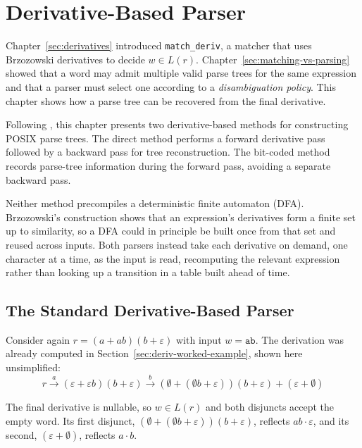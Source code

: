 \chapter{Derivative-Based Parser}
\label{sec:derivative-parser}

Chapter~\ref{sec:derivatives} introduced \texttt{match\_deriv},
a matcher that uses Brzozowski derivatives to decide $w \in L(r)$. 
Chapter~\ref{sec:matching-vs-parsing} showed 
that a word may admit multiple valid parse trees for the same expression
and that a parser must select one according to a \emph{disambiguation policy}.
This chapter shows how a parse tree can be recovered from the final derivative.

Following \citep[\S3, pp.~6--13]{sulzmannlu2014},
this chapter presents two derivative-based methods
for constructing POSIX parse trees.
The direct method performs a forward derivative pass
followed by a backward pass for tree reconstruction.
The bit-coded method records
parse-tree information during the forward pass,
avoiding a separate backward pass.

Neither method precompiles a deterministic finite automaton (DFA).
Brzozowski's construction shows that an expression's derivatives
form a finite set up to similarity, so a DFA could in principle be
built once from that set and reused across inputs.
Both parsers instead take each derivative on demand, one character
at a time, as the input is read, recomputing the relevant expression
rather than looking up a transition in a table built ahead of time.

%
%
%
%
%

\section{The Standard Derivative-Based Parser}
\label{sec:core-algorithm}
Consider again $r = (a+ab)(b+\varepsilon)$ with input $w = \mathtt{ab}$.
The derivation was already computed in Section~\ref{sec:deriv-worked-example}, 
shown here unsimplified:
\begin{equation}\label{eq:deriv-std-example}
r
  \xrightarrow{\ a\ } (\varepsilon + \varepsilon b)(b + \varepsilon)
  \xrightarrow{\ b\ } (\emptyset + (\emptyset b + \varepsilon))(b + \varepsilon) + (\varepsilon + \emptyset)
\end{equation}

The final derivative is nullable, 
so \(w \in L(r)\) and both disjuncts accept the empty word. 
Its first disjunct, \((\emptyset+(\emptyset b+\varepsilon))(b+\varepsilon)\), 
reflects \(ab\cdot\varepsilon\), and its second,
\((\varepsilon+\emptyset)\), reflects \(a\cdot b\).

